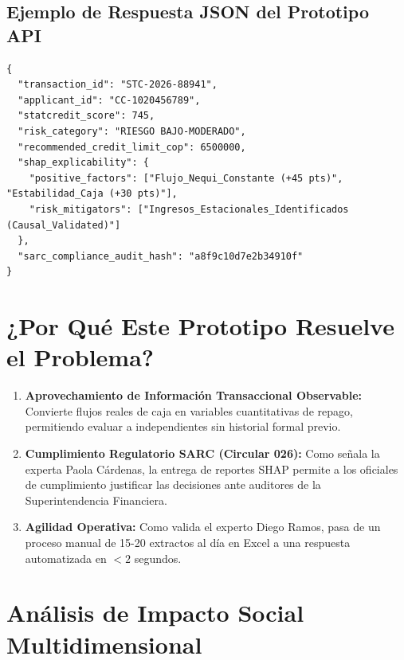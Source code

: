 \documentclass[11pt,a4paper]{article}
\begin{document}
\subsection{Ejemplo de Respuesta JSON del Prototipo API}
\begin{tcolorbox}[title=Salida JSON del Prototipo B2B]
\begin{verbatim}
{
  "transaction_id": "STC-2026-88941",
  "applicant_id": "CC-1020456789",
  "statcredit_score": 745,
  "risk_category": "RIESGO BAJO-MODERADO",
  "recommended_credit_limit_cop": 6500000,
  "shap_explicability": {
    "positive_factors": ["Flujo_Nequi_Constante (+45 pts)", "Estabilidad_Caja (+30 pts)"],
    "risk_mitigators": ["Ingresos_Estacionales_Identificados (Causal_Validated)"]
  },
  "sarc_compliance_audit_hash": "a8f9c10d7e2b34910f"
}
\end{verbatim}
\end{tcolorbox}

\section{¿Por Qué Este Prototipo Resuelve el Problema?}

\begin{enumerate}[leftmargin=*]
    \item \textbf{Aprovechamiento de Información Transaccional Observable:} Convierte flujos reales de caja en variables cuantitativas de repago, permitiendo evaluar a independientes sin historial formal previo.
    \item \textbf{Cumplimiento Regulatorio SARC (Circular 026):} Como señala la experta Paola Cárdenas, la entrega de reportes SHAP permite a los oficiales de cumplimiento justificar las decisiones ante auditores de la Superintendencia Financiera.
    \item \textbf{Agilidad Operativa:} Como valida el experto Diego Ramos, pasa de un proceso manual de 15-20 extractos al día en Excel a una respuesta automatizada en $<2$ segundos.
\end{enumerate}

\section{Análisis de Impacto Social Multidimensional}
\end{document}
